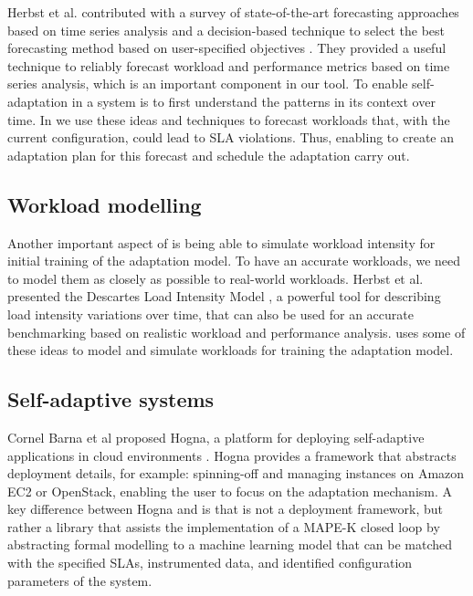 Herbst et al. contributed with a survey of state-of-the-art forecasting approaches based on time series analysis and a decision-based technique to select the best forecasting method based on user-specified objectives \cite{herbst_self-adaptive_2014}. They provided a useful technique to reliably forecast workload and performance metrics based on time series analysis, which is an important component in our tool. To enable self-adaptation in a system is to first understand the patterns in its context over time. In \projectname{} we use these ideas and techniques to forecast workloads that, with the current configuration, could lead to SLA violations. Thus, enabling \projectname{} to create an adaptation plan for this forecast and schedule the adaptation carry out.

\subsection{Workload modelling}

Another important aspect of \projectname{} is being able to simulate workload intensity for initial training of the adaptation model. To have an accurate workloads, we need to model them as closely as possible to real-world workloads. Herbst et al. presented the Descartes Load Intensity Model \cite{kistowski_modeling_2017}, a powerful tool for describing load intensity variations over time, that can also be used for an accurate benchmarking based on realistic workload and performance analysis. \projectname{} uses some of these ideas to model and simulate workloads for training the adaptation model.

\subsection{Self-adaptive systems}

Cornel Barna et al proposed Hogna, a platform for deploying self-adaptive applications in cloud environments \cite{barna_hogna:_2015}. Hogna provides a framework that abstracts deployment details, for example: spinning-off and managing instances on Amazon EC2 or OpenStack, enabling the user to focus on the adaptation mechanism. A key difference between Hogna and \projectname{} is that \projectname{} is not a deployment framework, but rather a library that assists the implementation of a MAPE-K closed loop by abstracting formal modelling to a machine learning model that can be matched with the specified SLAs, instrumented data, and identified configuration parameters of the system.

